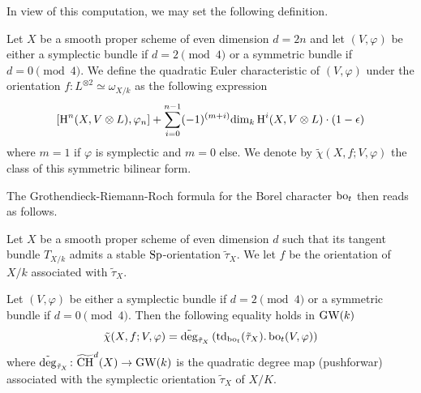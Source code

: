 In view of this computation, we may set the following definition.

\begin{df}\label{df:quad-Euler-char}
Let $X$ be a smooth proper scheme of even dimension $d=2n$ and let $(V,\varphi)$ be either a symplectic bundle if $d=2\pmod 4$ or a symmetric bundle if $d=0\pmod 4$. We define the quadratic Euler characteristic of $(V,\varphi)$ under the orientation $f:L^{\otimes2}\simeq \omega_{X/k}$ as the following expression
$$
[\operatorname{H}^n(X,V\otimes L),\varphi_n]+\sum_{i=0}^{n-1}(-1)^{(m+i)}\mathrm{dim}_k\operatorname{H}^i(X,V\otimes L)\cdot (1-\epsilon)
$$
where $m=1$ if $\varphi$ is symplectic and $m=0$ else.  We denote by $\tilde \chi(X,f;V,\varphi)$ the class of this symmetric bilinear form.
\end{df}


The Grothendieck-Riemann-Roch formula for the Borel character $\operatorname{bo}_t$ then reads as follows.
\begin{thm}\label{thm:HRR}
Let $X$ be a smooth proper scheme of even dimension $d$ such that its tangent bundle $T_{X/k}$ admits a stable $\mathrm{Sp}$-orientation $\tilde\tau_X$. We let $f$ be the orientation of $X/k$ associated with $\tilde\tau_X$.

Let $(V,\varphi)$ be either a symplectic bundle if $d=2\pmod 4$ or a symmetric bundle if $d=0\pmod 4$. Then the following equality holds in $\operatorname{GW}(k)$
$$
\tilde \chi(X,f;V,\varphi)=\tilde{\operatorname{deg}}_{\tilde \tau_X}\left(\operatorname{td}_{\operatorname{bo}_t}(\tilde \tau_X).\operatorname{bo}_t(V,\varphi)\right)
$$
where $\tilde{\operatorname{deg}}_{\tilde \tau_X}\colon\widetilde{\operatorname{CH}}^{d}(X)\to \operatorname{GW}(k)$ is the quadratic degree map
 (pushforwar) associated with the symplectic orientation $\tilde \tau_X$ of $X/K$.
\end{thm}

